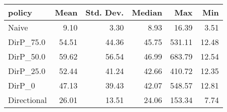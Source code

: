 \begin{tabular}{lrrrrr}
\toprule
     policy &  Mean &  Std. Dev. &  Median &    Max &   Min \\
\midrule
      Naive &  9.10 &       3.30 &    8.93 &  16.39 &  3.51 \\
  DirP\_75.0 & 54.51 &      44.36 &   45.75 & 531.11 & 12.48 \\
  DirP\_50.0 & 59.62 &      56.54 &   46.99 & 683.79 & 12.54 \\
  DirP\_25.0 & 52.44 &      41.24 &   42.66 & 410.72 & 12.35 \\
     DirP\_0 & 47.13 &      39.43 &   42.07 & 548.57 & 12.81 \\
Directional & 26.01 &      13.51 &   24.06 & 153.34 &  7.74 \\
\bottomrule
\end{tabular}
